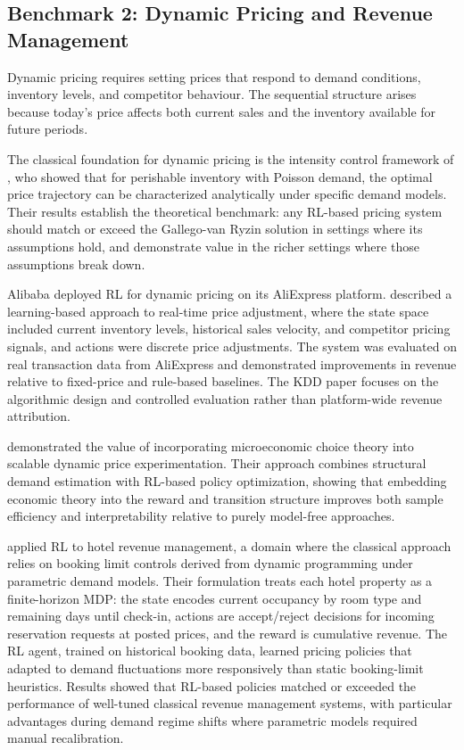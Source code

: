 \subsection{Benchmark 2: Dynamic Pricing and Revenue Management}
\label{sec:benchmark_hotel}

Dynamic pricing requires setting prices that respond to demand conditions, inventory levels, and competitor behaviour. The sequential structure arises because today's price affects both current sales and the inventory available for future periods.

The classical foundation for dynamic pricing is the intensity control framework of \citet{Gallego1994pricing}, who showed that for perishable inventory with Poisson demand, the optimal price trajectory can be characterized analytically under specific demand models. Their results establish the theoretical benchmark: any RL-based pricing system should match or exceed the Gallego-van Ryzin solution in settings where its assumptions hold, and demonstrate value in the richer settings where those assumptions break down.

Alibaba deployed RL for dynamic pricing on its AliExpress platform. \citet{Alibaba2019} described a learning-based approach to real-time price adjustment, where the state space included current inventory levels, historical sales velocity, and competitor pricing signals, and actions were discrete price adjustments. The system was evaluated on real transaction data from AliExpress and demonstrated improvements in revenue relative to fixed-price and rule-based baselines. The KDD paper focuses on the algorithmic design and controlled evaluation rather than platform-wide revenue attribution.

\citet{Misra2019} demonstrated the value of incorporating microeconomic choice theory into scalable dynamic price experimentation. Their approach combines structural demand estimation with RL-based policy optimization, showing that embedding economic theory into the reward and transition structure improves both sample efficiency and interpretability relative to purely model-free approaches.

\citet{Chen2023hotelrl} applied RL to hotel revenue management, a domain where the classical approach relies on booking limit controls derived from dynamic programming under parametric demand models. Their formulation treats each hotel property as a finite-horizon MDP: the state encodes current occupancy by room type and remaining days until check-in, actions are accept/reject decisions for incoming reservation requests at posted prices, and the reward is cumulative revenue. The RL agent, trained on historical booking data, learned pricing policies that adapted to demand fluctuations more responsively than static booking-limit heuristics. Results showed that RL-based policies matched or exceeded the performance of well-tuned classical revenue management systems, with particular advantages during demand regime shifts where parametric models required manual recalibration.

